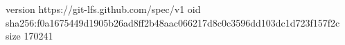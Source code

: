 version https://git-lfs.github.com/spec/v1
oid sha256:f0a1675449d1905b26ad8ff2b48aac066217d8c0c3596dd103dc1d723f157f2c
size 170241
